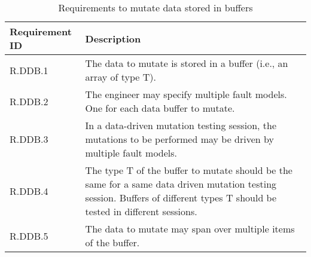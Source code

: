 \begin{table}[h]
\begin{center}
\small
\begin{tabular}{|p{2cm}|p{12cm}|}
\hline
\textbf{Requirement ID}&\textbf{Description}\\
\hline
R.DDB.1&
The data to mutate is stored in a buffer (i.e., an array of type T).
\\
\hline
R.DDB.2&
The engineer may specify multiple fault models. One for each data buffer to mutate.
\\
\hline
R.DDB.3&
In a data-driven mutation testing session, the mutations to be performed may be driven by multiple fault models.
\\
\hline
R.DDB.4&
\begin{minipage}{12cm}
The type T of the buffer to mutate should be the same for a same data driven mutation testing session. Buffers of different types T should be tested in different sessions.
\end{minipage}
\\
\hline
R.DDB.5&
The data to mutate may span over multiple items of the buffer.
\\


\hline
\end{tabular}
\end{center}
\caption{Requirements to mutate data stored in buffers}
\label{table:faultModel:FAQAS}
\end{table}%